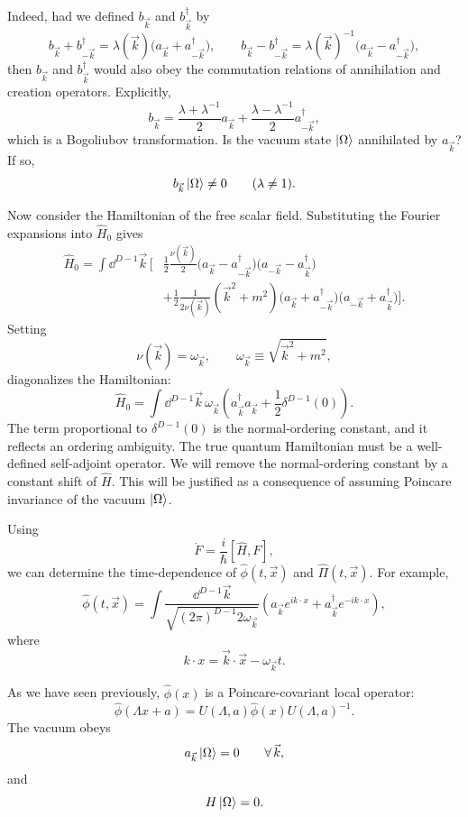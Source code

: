 Indeed, had we defined \(b_{\vec k}\) and \(b^\dagger_{\vec k}\) by
\[
  b_{\vec k}+b^\dagger_{-\vec k}
  =
  \lambda(\vec k)\bigl(a_{\vec k}+a^\dagger_{-\vec k}\bigr),
  \qquad
  b_{\vec k}-b^\dagger_{-\vec k}
  =
  \lambda(\vec k)^{-1}
  \bigl(a_{\vec k}-a^\dagger_{-\vec k}\bigr),
\]
then \(b_{\vec k}\) and \(b^\dagger_{\vec k}\) would also obey the
commutation relations of annihilation and creation operators. Explicitly,
\[
  b_{\vec k}
  =
  \frac{\lambda+\lambda^{-1}}{2}a_{\vec k}
  +
  \frac{\lambda-\lambda^{-1}}{2}a^\dagger_{-\vec k},
\]
which is a Bogoliubov transformation. Is the vacuum state \(\ket{\Omega}\)
annihilated by \(a_{\vec k}\)? If so,
\[
  b_{\vec k}\ket{\Omega}\ne 0
  \qquad
  (\lambda\ne 1).
\]

Now consider the Hamiltonian of the free scalar field. Substituting the
Fourier expansions into \(\hat H_0\) gives
\[
\begin{aligned}
  \hat H_0
  =
  \int\dd^{D-1}\vec k\,
  \Bigg[
  &\frac12\frac{\nu(\vec k)}{2}
  \bigl(a_{\vec k}-a^\dagger_{-\vec k}\bigr)
  \bigl(a_{-\vec k}-a^\dagger_{\vec k}\bigr)\\
  &+
  \frac12\frac{1}{2\nu(\vec k)}
  (\vec k^2+m^2)
  \bigl(a_{\vec k}+a^\dagger_{-\vec k}\bigr)
  \bigl(a_{-\vec k}+a^\dagger_{\vec k}\bigr)
  \Bigg].
\end{aligned}
\]
Setting
\[
  \nu(\vec k)=\omega_{\vec k},
  \qquad
  \omega_{\vec k}\equiv\sqrt{\vec k^2+m^2},
\]
diagonalizes the Hamiltonian:
\[
  \hat H_0
  =
  \int\dd^{D-1}\vec k\,
  \omega_{\vec k}
  \left(
    a^\dagger_{\vec k}a_{\vec k}
    +\frac12\delta^{D-1}(0)
  \right).
\]
The term proportional to \(\delta^{D-1}(0)\) is the normal-ordering constant,
and it reflects an ordering ambiguity. The true quantum Hamiltonian must be a
well-defined self-adjoint operator. We will remove the normal-ordering
constant by a constant shift of \(\hat H\). This will be justified as a
consequence of assuming Poincare invariance of the vacuum \(\ket{\Omega}\).

Using
\[
  \dot F=\frac{i}{\hbar}[\hat H,F],
\]
we can determine the time-dependence of \(\hat\phi(t,\vec x)\) and
\(\hat\Pi(t,\vec x)\). For example,
\[
  \hat\phi(t,\vec x)
  =
  \int
  \frac{\dd^{D-1}\vec k}
  {\sqrt{(2\pi)^{D-1}2\omega_{\vec k}}}
  \left(
    a_{\vec k}e^{ik\cdot x}
    +a^\dagger_{\vec k}e^{-ik\cdot x}
  \right),
\]
where
\[
  k\cdot x=\vec k\cdot\vec x-\omega_{\vec k}t .
\]

As we have seen previously, \(\hat\phi(x)\) is a Poincare-covariant local
operator:
\[
  \hat\phi(\Lambda x+a)
  =
  U(\Lambda,a)\hat\phi(x)U(\Lambda,a)^{-1}.
\]
The vacuum obeys
\[
  a_{\vec k}\ket{\Omega}=0
  \qquad \forall\,\vec k,
\]
and
\[
  H\ket{\Omega}=0.
\]

